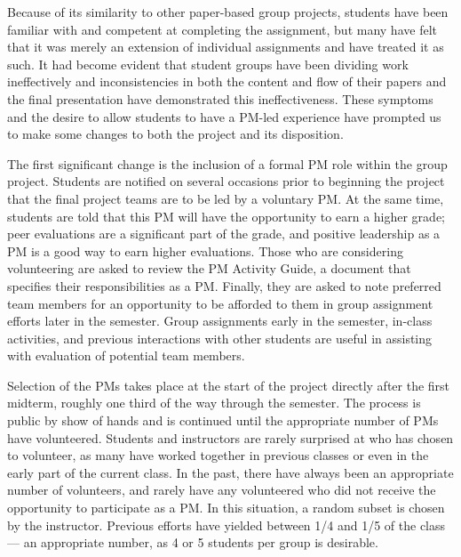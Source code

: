 \documentclass{sig-alternate}
\begin{document}
Because of its similarity to other paper-based group projects, students have been familiar with and
competent at completing the assignment, but many have felt that it was merely an extension of individual
assignments and have treated it as such. It had become evident that student groups have been dividing work
ineffectively and inconsistencies in both the content and flow of their papers and the final presentation
have demonstrated this ineffectiveness. These symptoms and the desire to allow students to have a PM-led 
experience have prompted us to make some changes to both the project and its disposition.

The first significant change is the inclusion of a formal PM role within the group project. Students
are notified on several occasions prior to beginning the project that the final project teams are to be led by
a voluntary PM. At the same time, students are told that this PM will have the opportunity to earn a
higher grade; peer evaluations are a significant part of the grade, and positive leadership as a PM is a
good way to earn higher evaluations. Those who are considering volunteering are asked to review the PM
Activity Guide, a document that specifies their responsibilities as a PM. Finally, they are asked to note
preferred team members for an opportunity to be afforded to them in group assignment efforts later in the
semester.  Group assignments early in the semester, in-class activities, and previous interactions with other
students are useful in assisting with evaluation of potential team members.

Selection of the PMs takes place at the start of the project directly after the first midterm, roughly one
third of the way through the semester. The process is public by show of hands and is continued until the
appropriate number of PMs have volunteered. Students and instructors are rarely surprised at who has
chosen to volunteer, as many have worked together in previous classes or even in the early part of the
current class. In the past, there have always been an appropriate number of volunteers, and rarely have
any volunteered who did not receive the opportunity to participate as a PM.  In this situation, a random subset
is chosen by the instructor. Previous efforts have yielded
between 1/4 and 1/5 of the class --- an appropriate number, as 4 or 5 students per group is desirable.
\end{document}
